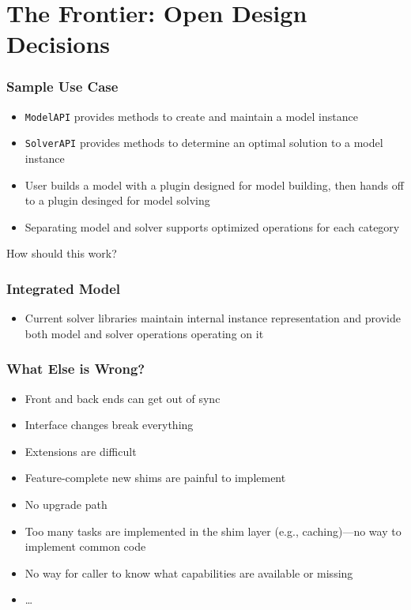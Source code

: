 \documentclass{beamer}
\begin{document}
\section{The Frontier: Open Design Decisions}

\begin{frame}
  \frametitle{Sample Use Case}

  \begin{itemize}
  \item \lstinline|ModelAPI| provides methods to create and maintain
    a model instance
  \item \lstinline|SolverAPI| provides methods to determine an
    optimal solution to a model instance
  \item User builds a model with a plugin designed for model
    building, then hands off to a plugin desinged for model solving
  \item Separating model and solver supports optimized operations
    for each category
  \end{itemize}

  How should this work?

\end{frame}

\begin{frame}
  \frametitle{Integrated Model}

  \begin{itemize}
  \item Current solver libraries maintain internal instance
    representation and provide both model and solver operations
    operating on it
  \end{itemize}
\end{frame}

\begin{frame}
  \frametitle{What Else is Wrong?}

  \begin{itemize}
  \item Front and back ends can get out of sync
  \item Interface changes break everything
  \item Extensions are difficult
  \item Feature-complete new shims are painful to implement
  \item No upgrade path
  \item Too many tasks are implemented in the shim layer (e.g.,
    caching)---no way to implement common code
  \item No way for caller to know what capabilities are available or
    missing
  \item \dots
  \end{itemize}
\end{frame}
\end{document}
